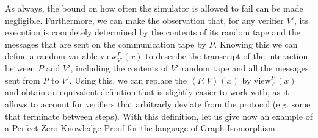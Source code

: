 \documentclass{article}
\begin{document}
As always, the bound on how often the simulator is allowed to fail can be made negligible. 
Furthermore, we can make the observation that, for any verifier $V'$, its execution is completely determined by the contents of its random tape and the messages that
are sent on the communication tape by $P$. Knowing this we can define a random variable $\text{view}^{P}_{V'}(x)$ to describe the transcript of the interaction between $P$ and $V'$, including the contents of $V'$ random tape and all the messages sent from $P$ to $V'$. 
Using this, we can replace the $\left<P, V\right>(x)$ by $\text{view}^{P}_{V'}(x)$ and obtain an equivalent definition that is slightly easier to work with, as it allows to account for verifiers that arbitrarly deviate from the protocol (e.g. some that terminate between steps). 
With this definition, let us give now an example of a Perfect Zero Knowledge Proof for the language of Graph Isomorphism.
\end{document}
